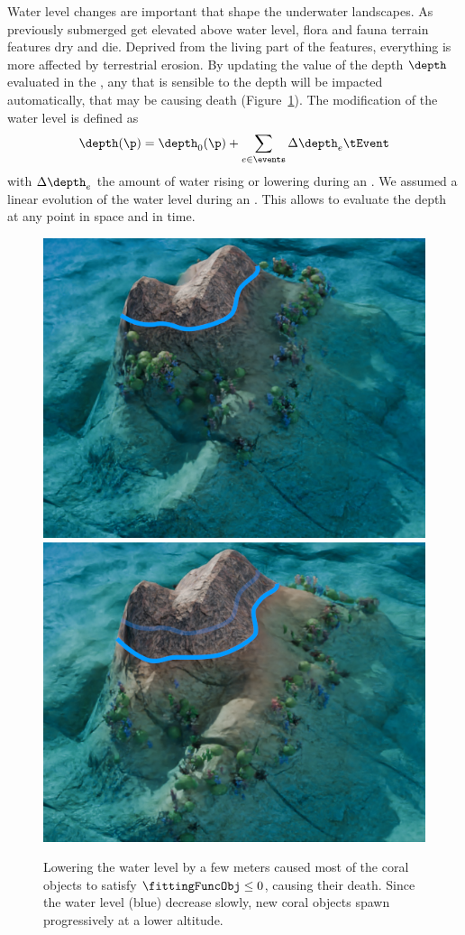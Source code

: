 Water level changes are important  that shape the underwater landscapes. As previously submerged  get elevated above water level, flora and fauna terrain features dry and die. Deprived from the living part of the features, everything is more affected by terrestrial erosion. By updating the value of the depth $\depth$ evaluated in the , any  that is sensible to the depth will be impacted automatically, that may be causing death (Figure~\ref{fig:semantic-representation_water-event}). The modification of the water level is defined as 
\begin{align*}
    \depth(\p) = \depth_0(\p) + \sum_{e \in \events} \Delta \depth_e \tEvent
\end{align*}
with $\Delta \depth_e$ the amount of water rising or lowering during an . We assumed a linear evolution of the water level during an . This allows to evaluate the depth at any point in space and in time.

\begin{figure}
    \includegraphics[width = 0.45 \linewidth]{Figures/Interactions/InteractionWater1.png}
    \includegraphics[width = 0.45 \linewidth]{Figures/Interactions/InteractionWater3.png}
    \caption{Lowering the water level by a few meters caused most of the coral objects to satisfy $\fittingFuncObj \leq 0$, causing their death. Since the water level (blue) decrease slowly, new coral objects spawn progressively at a lower altitude.}
    \label{fig:semantic-representation_water-event}
\end{figure}

